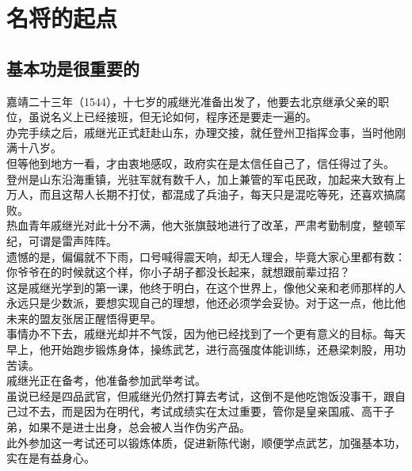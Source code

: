 \section{名将的起点}
\ifnum{}
	\begin{multicols}{\theparacolNo}
\fi
\subsection{基本功是很重要的}
嘉靖二十三年（1544），十七岁的戚继光准备出发了，他要去北京继承父亲的职位，虽说名义上已经接班，但无论如何，程序还是要走一遍的。\\

办完手续之后，戚继光正式赶赴山东，办理交接，就任登州卫指挥佥事，当时他刚满十八岁。\\

但等他到地方一看，才由衷地感叹，政府实在是太信任自己了，信任得过了头。\\

登州是山东沿海重镇，光驻军就有数千人，加上兼管的军屯民政，加起来大致有上万人，而且这帮人长期不打仗，都混成了兵油子，每天只是混吃等死，还喜欢搞腐败。\\

热血青年戚继光对此十分不满，他大张旗鼓地进行了改革，严肃考勤制度，整顿军纪，可谓是雷声阵阵。\\

遗憾的是，偏偏就不下雨，口号喊得震天响，却无人理会，毕竟大家心里都有数：你爷爷在的时候就这个样，你小子胡子都没长起来，就想跟前辈过招？\\

这是戚继光学到的第一课，他终于明白，在这个世界上，像他父亲和老师那样的人永远只是少数派，要想实现自己的理想，他还必须学会妥协。对于这一点，他比他未来的盟友张居正醒悟得更早。\\

事情办不下去，戚继光却并不气馁，因为他已经找到了一个更有意义的目标。每天早上，他开始跑步锻炼身体，操练武艺，进行高强度体能训练，还悬梁刺股，用功苦读。\\

戚继光正在备考，他准备参加武举考试。\\

虽说已经是四品武官，但戚继光仍然打算去考试，这倒不是他吃饱饭没事干，跟自己过不去，而是因为在明代，考试成绩实在太过重要，管你是皇亲国戚、高干子弟，如果不是进士出身，总会被人当作伪劣产品。\\

此外参加这一考试还可以锻炼体质，促进新陈代谢，顺便学点武艺，加强基本功，实在是有益身心。\\


\end{multicols}
